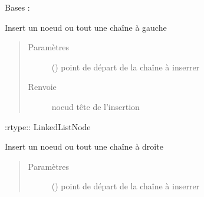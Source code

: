 \documentclass[letterpaper,10pt,french]{sphinxmanual}
\begin{document}
\begin{fulllineitems}
\label{\detokenize{linkedlistnode:linkedlistnode.LinkedListNode}}
Bases : 

\begin{fulllineitems}
\label{\detokenize{linkedlistnode:linkedlistnode.LinkedListNode.insertLeft}}
Insert un noeud ou tout une chaîne à gauche
\begin{quote}\begin{description}
\item[{Paramètres}] \leavevmode
{} (\sphinxstyleliteralemphasis{\sphinxupquote{{[}}}\sphinxstyleliteralemphasis{\sphinxupquote{, }}\sphinxstyleliteralemphasis{\sphinxupquote{{]}}}) \textendash{} point de départ de la chaîne à inserrer

\item[{Renvoie}] \leavevmode
noeud tête de l’insertion

\end{description}\end{quote}

:rtype:: LinkedListNode

\end{fulllineitems}


\begin{fulllineitems}
\label{\detokenize{linkedlistnode:linkedlistnode.LinkedListNode.insertRight}}
Insert un noeud ou tout une chaîne à droite
\begin{quote}\begin{description}
\item[{Paramètres}] \leavevmode
{} (\sphinxstyleliteralemphasis{\sphinxupquote{{[}}}\sphinxstyleliteralemphasis{\sphinxupquote{, }}\sphinxstyleliteralemphasis{\sphinxupquote{{]}}}) \textendash{} point de départ de la chaîne à inserrer


\end{description}
\end{quote}
\end{fulllineitems}
\end{fulllineitems}
\end{document}
